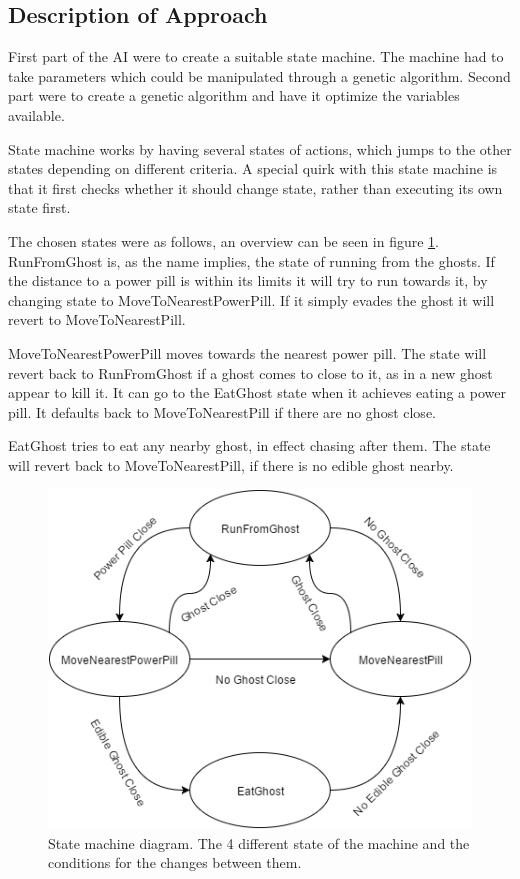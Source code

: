 \documentclass[conference,compsoc]{IEEEtran}
\begin{document}
\subsection{Description of Approach}
First part of the AI were to create a suitable state machine. The machine had to take parameters which could be manipulated through a genetic algorithm. Second part were to create a genetic algorithm and have it optimize the variables available.

State machine works by having several states of actions, which jumps to the other states depending on different criteria. A special quirk with this state machine is that it first checks whether it should change state, rather than executing its own state first. 

The chosen states were as follows, an overview can be seen in figure \ref{fig:StateMach}. RunFromGhost is, as the name implies, the state of running from the ghosts. If the distance to a power pill is within its limits it will try to run towards it, by changing state to MoveToNearestPowerPill. If it simply evades the ghost it will revert to MoveToNearestPill.

MoveToNearestPowerPill moves towards the nearest power pill. The state will revert back to RunFromGhost if a ghost comes to close to it, as in a new ghost appear to kill it. It can go to the EatGhost state when it achieves eating a power pill. It defaults back to MoveToNearestPill if there are no ghost close.

EatGhost tries to eat any nearby ghost, in effect chasing after them. The state will revert back to MoveToNearestPill, if there is no edible ghost nearby.
\begin{figure}[h]
	\graphicspath{{figures/}}
	\includegraphics[scale=0.5]{StateMachineDiagram.png}
	\caption{State machine diagram. The 4 different state of the machine and the conditions for the changes between them.}
	\label{fig:StateMach}
\end{figure}
\end{document}
